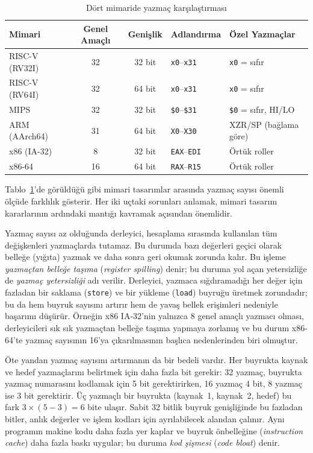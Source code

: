 \begin{table}[H]
\centering
\caption{Dört mimaride yazmaç karşılaştırması}
\label{tab:yazmac-karsilastirma}
\small
\begin{tabular}{lccll}
\toprule
\textbf{Mimari} & \textbf{Genel Amaçlı} & \textbf{Genişlik} & \textbf{Adlandırma} & \textbf{Özel Yazmaçlar} \\
\midrule
RISC-V (RV32I) & 32 & 32 bit & \texttt{x0}--\texttt{x31} & \texttt{x0} = sıfır \\
RISC-V (RV64I) & 32 & 64 bit & \texttt{x0}--\texttt{x31} & \texttt{x0} = sıfır \\
MIPS            & 32 & 32 bit & \texttt{\$0}--\texttt{\$31} & \texttt{\$0} = sıfır, HI/LO \\
ARM (AArch64)   & 31 & 64 bit & \texttt{X0}--\texttt{X30} & XZR/SP (bağlama göre) \\
x86 (IA-32)     & 8  & 32 bit & \texttt{EAX}--\texttt{EDI} & Örtük roller \\
x86-64          & 16 & 64 bit & \texttt{RAX}--\texttt{R15} & Örtük roller \\
\bottomrule
\end{tabular}
\end{table}

Tablo~\ref{tab:yazmac-karsilastirma}'de görüldüğü gibi mimari tasarımlar arasında yazmaç sayısı önemli ölçüde farklılık gösterir. Her iki uçtaki sorunları anlamak, mimari tasarım kararlarının ardındaki mantığı kavramak açısından önemlidir.

Yazmaç sayısı az olduğunda derleyici, hesaplama sırasında kullanılan tüm değişkenleri yazmaçlarda tutamaz. Bu durumda bazı değerleri geçici olarak belleğe (yığıta) yazmak ve daha sonra geri okumak zorunda kalır. Bu işleme \emph{yazmaçtan belleğe taşıma} (\emph{register spilling}) denir; bu duruma yol açan yetersizliğe de \emph{yazmaç yetersizliği} adı verilir. Derleyici, yazmaca sığdıramadığı her değer için fazladan bir saklama (\texttt{store}) ve bir yükleme (\texttt{load}) buyruğu üretmek zorundadır; bu da hem buyruk sayısını artırır hem de yavaş bellek erişimleri nedeniyle başarımı düşürür. Örneğin x86 IA-32'nin yalnızca 8 genel amaçlı yazmacı olması, derleyicileri sık sık yazmaçtan belleğe taşıma yapmaya zorlamış ve bu durum x86-64'te yazmaç sayısının 16'ya çıkarılmasının başlıca nedenlerinden biri olmuştur.

Öte yandan yazmaç sayısını artırmanın da bir bedeli vardır. Her buyrukta kaynak ve hedef yazmaçlarını belirtmek için daha fazla bit gerekir: 32 yazmaç, buyrukta yazmaç numarasını kodlamak için 5 bit gerektirirken, 16 yazmaç 4 bit, 8 yazmaç ise 3 bit gerektirir. Üç yazmaçlı bir buyrukta (kaynak~1, kaynak~2, hedef) bu fark $3 \times (5 - 3) = 6$ bite ulaşır. Sabit 32 bitlik buyruk genişliğinde bu fazladan bitler, anlık değerler ve işlem kodları için ayrılabilecek alandan çalınır. Aynı programın makine kodu daha fazla yer kaplar ve buyruk önbelleğine (\emph{instruction cache}) daha fazla baskı uygular; bu duruma \emph{kod şişmesi} (\emph{code bloat}) denir.


